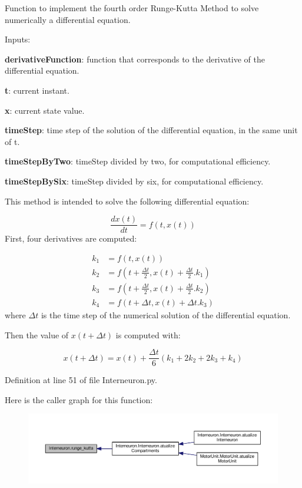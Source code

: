 Function to implement the fourth order Runge-\/\+Kutta Method to solve numerically a differential equation. 


\begin{DoxyItemize}
\item Inputs\+:
\begin{DoxyItemize}
\item {\bfseries derivative\+Function}\+: function that corresponds to the derivative of the differential equation.
\item {\bfseries t}\+: current instant.
\item {\bfseries x}\+: current state value.
\item {\bfseries time\+Step}\+: time step of the solution of the differential equation, in the same unit of t.
\item {\bfseries time\+Step\+By\+Two}\+: time\+Step divided by two, for computational efficiency.
\item {\bfseries time\+Step\+By\+Six}\+: time\+Step divided by six, for computational efficiency.
\end{DoxyItemize}
\end{DoxyItemize}

This method is intended to solve the following differential equation\+:

\begin{equation} \frac{dx(t)}{dt} = f(t, x(t)) \end{equation} First, four derivatives are computed\+:

\begin{align} k_1 &= f(t,x(t))\\ k_2 &= f(t+\frac{\Delta t}{2}, x(t) + \frac{\Delta t}{2}.k_1)\\ k_3 &= f(t+\frac{\Delta t}{2}, x(t) + \frac{\Delta t}{2}.k_2)\\ k_4 &= f(t+\Delta t, x(t) + \Delta t.k_3) \end{align} where $\Delta t$ is the time step of the numerical solution of the differential equation.

Then the value of $x(t+\Delta t)$ is computed with\+:

\begin{equation} x(t+\Delta t) = x(t) + \frac{\Delta t}{6}(k_1 + 2k_2 + 2k_3+k_4) \end{equation} 

Definition at line 51 of file Interneuron.\+py.



Here is the caller graph for this function\+:
\nopagebreak
\begin{figure}[H]
\begin{center}
\leavevmode
\includegraphics[width=350pt]{namespace_interneuron_a3c7f009c4357310ae71cedad2abfd716_icgraph}
\end{center}
\end{figure}


